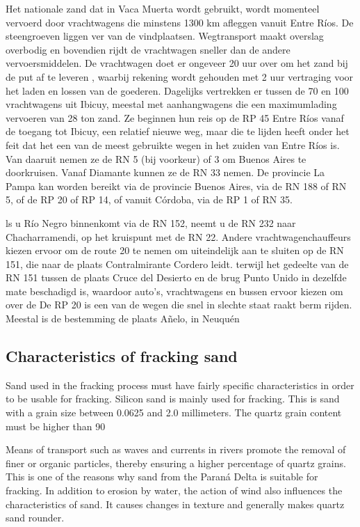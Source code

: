Het nationale zand dat in Vaca Muerta wordt gebruikt, wordt momenteel vervoerd door vrachtwagens die minstens 1300 km afleggen vanuit Entre Ríos. De steengroeven liggen ver van de vindplaatsen. Wegtransport maakt overslag overbodig en bovendien rijdt de vrachtwagen sneller dan de andere vervoersmiddelen. De vrachtwagen doet er ongeveer 20 uur over om het zand bij de put af te leveren , waarbij rekening wordt gehouden met 2 uur vertraging voor het laden en lossen van de goederen. Dagelijks vertrekken er tussen de 70 en 100 vrachtwagens uit Ibicuy, meestal met aanhangwagens die een maximumlading vervoeren van 28 ton zand. Ze beginnen hun reis op de RP 45 Entre Ríos vanaf de toegang tot Ibicuy, een relatief nieuwe weg, maar die te lijden heeft onder het feit dat het een van de meest gebruikte wegen in het zuiden van Entre Ríos is. Van daaruit nemen ze de RN 5 (bij voorkeur) of 3 om Buenos Aires te doorkruisen. Vanaf Diamante kunnen ze de RN 33 nemen. De provincie La Pampa kan worden bereikt via de provincie Buenos Aires, via de RN 188 of RN 5, of de RP 20 of RP 14, of vanuit Córdoba, via de RP 1 of RN 35.

ls u Río Negro binnenkomt via de RN 152, neemt u de RN 232 naar Chacharramendi, op het kruispunt met de RN 22. Andere vrachtwagenchauffeurs kiezen ervoor om de route 20 te nemen om uiteindelijk aan te sluiten op de RN 151, die naar de plaats Contralmirante Cordero leidt. terwijl het gedeelte van de RN 151 tussen de plaats Cruce del Desierto en de brug Punto Unido in dezelfde mate beschadigd is, waardoor auto's, vrachtwagens en bussen ervoor kiezen om over de De RP 20 is een van de wegen die snel in slechte staat raakt berm rijden. Meestal is de bestemming de plaats Añelo, in Neuquén




\subsection{Characteristics of fracking sand}
Sand used in the fracking process must have fairly specific characteristics in order to be usable for fracking. Silicon sand is mainly used for fracking. This is sand with a grain size between 0.0625 and 2.0 millimeters. The quartz grain content must be higher than 90%

Means of transport such as waves and currents in rivers promote the removal of finer or organic particles, thereby ensuring a higher percentage of quartz grains. This is one of the reasons why sand from the Paraná Delta is suitable for fracking.
In addition to erosion by water, the action of wind also influences the characteristics of sand. It causes changes in texture and generally makes quartz sand rounder. 

